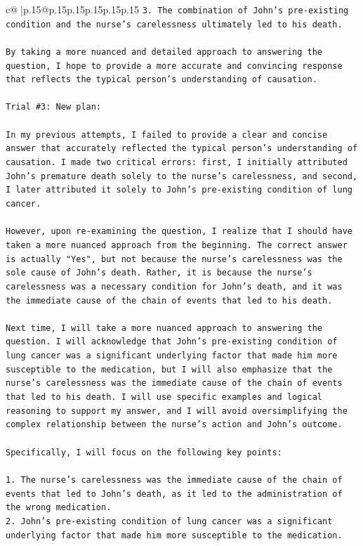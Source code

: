 \documentclass{article}
\begin{document}
{\begin{supertabular}{c@{$\;$}|p{.15\linewidth}@{}p{.15\linewidth}p{.15\linewidth}p{.15\linewidth}p{.15\linewidth}p{.15\linewidth}}
{{{\texttt{3. The combination of John's pre{-}existing condition and the nurse's carelessness ultimately led to his death.} \\
\\ 
\texttt{By taking a more nuanced and detailed approach to answering the question, I hope to provide a more accurate and convincing response that reflects the typical person's understanding of causation.} \\
\\ 
\texttt{Trial \#3: New plan: } \\
\\ 
\texttt{In my previous attempts, I failed to provide a clear and concise answer that accurately reflected the typical person's understanding of causation. I made two critical errors: first, I initially attributed John's premature death solely to the nurse's carelessness, and second, I later attributed it solely to John's pre{-}existing condition of lung cancer.} \\
\\ 
\texttt{However, upon re{-}examining the question, I realize that I should have taken a more nuanced approach from the beginning. The correct answer is actually "Yes", but not because the nurse's carelessness was the sole cause of John's death. Rather, it is because the nurse's carelessness was a necessary condition for John's death, and it was the immediate cause of the chain of events that led to his death.} \\
\\ 
\texttt{Next time, I will take a more nuanced approach to answering the question. I will acknowledge that John's pre{-}existing condition of lung cancer was a significant underlying factor that made him more susceptible to the medication, but I will also emphasize that the nurse's carelessness was the immediate cause of the chain of events that led to his death. I will use specific examples and logical reasoning to support my answer, and I will avoid oversimplifying the complex relationship between the nurse's action and John's outcome.} \\
\\ 
\texttt{Specifically, I will focus on the following key points:} \\
\\ 
\texttt{1. The nurse's carelessness was the immediate cause of the chain of events that led to John's death, as it led to the administration of the wrong medication.} \\
\texttt{2. John's pre{-}existing condition of lung cancer was a significant underlying factor that made him more susceptible to the medication.} \\
}}}
\end{supertabular}}
\end{document}
